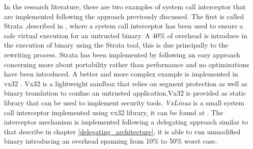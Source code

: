 In the research literature, there are two examples of system call interceptor that are implemented following the approach previously discussed. The first is called Strata ,described in \cite{Strata}, where a system call interceptor has been used to ensure a safe virtual execution for an untrusted binary.  A 40\% of overhead is introduce in the execution of binary using the Strata tool, this is due principally to the rewriting process.  Strata has been implemented by following an easy approach concerning more about portability rather than performance and no optimizations have been introduced. A better and more complex example is implemented in vx32 \cite{vx32}. Vx32 is a lightweight sandbox that relies on segment protection as well as binary translation to confine an untrusted application.Vx32 is provided as static library that can be used to implement security tools. \emph{VxLinux} is a small system call interceptor implemented using vx32 library, it can be found at \cite{soft:vx32}. The interceptor mechanism is implemented following a delegating approach similar to that describe in chapter \ref{delegating_architecture}, it is able to run unmodified binary introducing an overhead spanning from 10\% to 50\% worst case. 


